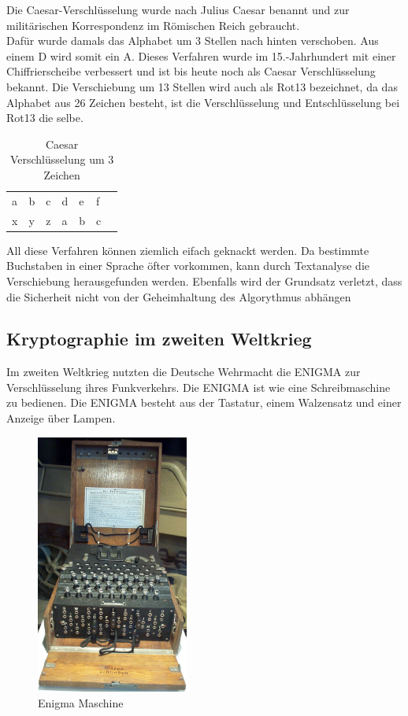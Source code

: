 Die Caesar-Verschlüsselung wurde nach Julius Caesar benannt und zur militärischen Korrespondenz im Römischen Reich gebraucht.\\
Dafür wurde damals das Alphabet um 3 Stellen nach hinten verschoben. Aus einem D wird somit ein A. Dieses Verfahren wurde im 15.-Jahrhundert mit einer
Chiffrierscheibe verbessert und ist bis heute noch als Caesar Verschlüsselung bekannt. Die Verschiebung um 13 Stellen wird auch als Rot13 bezeichnet, 
da das Alphabet aus 26 Zeichen besteht, ist die Verschlüsselung und Entschlüsselung bei Rot13 die selbe.

\begin{table}[ht]
\caption{Caesar Verschlüsselung um 3 Zeichen}
\begin{center}
\begin{tabular}{|l|l|l|l|l|l|l|}
  a & b & c & d & e & f\\
  x & y & z & a & b & c\\
\end{tabular}
\end{center}
\end{table}

All diese Verfahren können ziemlich eifach geknackt werden. Da bestimmte Buchstaben in einer Sprache öfter vorkommen, kann durch Textanalyse die Verschiebung herausgefunden werden. Ebenfalls wird der Grundsatz verletzt, dass die Sicherheit nicht von der Geheimhaltung
des Algorythmus abhängen 

\subsection{Kryptographie im zweiten Weltkrieg}
Im zweiten Weltkrieg nutzten die Deutsche Wehrmacht die ENIGMA zur Verschlüsselung ihres Funkverkehrs. Die ENIGMA ist wie eine Schreibmaschine zu bedienen. Die ENIGMA besteht aus der Tastatur, einem Walzensatz und einer Anzeige über Lampen. 

\begin{figure}[ht]
\begin{center}
\includegraphics[width=5cm]{images/Enigma_Verkehrshaus_Luzern_cropped.jpg}
\caption{Enigma Maschine}
\end{center}
\end{figure}

